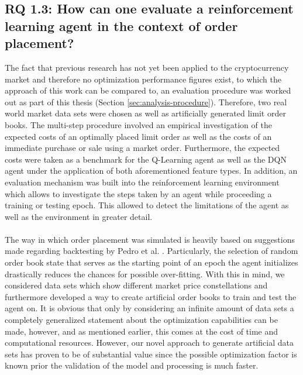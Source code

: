 \subsection{RQ 1.3: How can one evaluate a reinforcement learning agent in the context of order placement?}

    The fact that previous research has not yet been applied to the cryptocurrency market and therefore no optimization performance figures exist, to which the approach of this work can be compared to, an evaluation procedure was worked out as part of this thesis (Section \ref{sec:analysis-procedure}).
    Therefore, two real world market data sets were chosen as well as artificially generated limit order books.
    The multi-step procedure involved an empirical investigation of the expected costs of an optimally placed limit order as well as the costs of an immediate purchase or sale using a market order.
    Furthermore, the expected costs were taken as a benchmark for the Q-Learning agent as well as the DQN agent under the application of both aforementioned feature types.
    In addition, an evaluation mechanism was built into the reinforcement learning environment which allows to investigate the steps taken by an agent while proceeding a training or testing epoch.
    This allowed to detect the limitations of the agent as well as the environment in greater detail.
    \\
    \\
    The way in which order placement was simulated is heavily based on suggestions made regarding backtesting by Pedro et al. \cite{de2018advances}.
    Particularly, the selection of random order book state that serves as the starting point of an epoch the agent initializes drastically reduces the chances for possible over-fitting.
    With this in mind, we considered data sets which show different market price constellations and furthermore developed a way to create artificial order books to train and test the agent on.
    It is obvious that only by considering an infinite amount of data sets a completely generalized statement about the optimization capabilities can be made, however, and as mentioned earlier, this comes at the cost of time and computational resources.
    However, our novel approach to generate artificial data sets has proven to be of substantial value since the possible optimization factor is known prior the validation of the model and processing is much faster.
    
